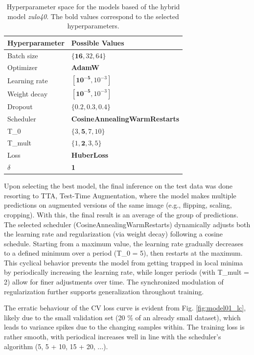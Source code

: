 \documentclass[conference]{IEEEtran}
\begin{document}
\begin{table}[H]
\centering
\caption{Hyperparameter space for the models based of the hybrid model \textit{zulo40}. The bold values correspond to the selected hyperparameters.}
\label{parametroszulp}
\begin{tabular}{ll}
\toprule
\textbf{Hyperparameter} & \textbf{Possible Values} \\
\midrule
Batch size & $\{\mathbf{16}, 32, 64\}$ \\
Optimizer & \textbf{AdamW} \\
Learning rate & $[\mathbf{10^{-5}}, 10^{-3}]$ \\
Weight decay & $[\mathbf{10^{-5}}, 10^{-3}]$ \\
Dropout & $\{0.2, 0.3, \mathbf{0.4}\}$ \\
Scheduler & \textbf{CosineAnnealingWarmRestarts} \\
T\_0 & $\{3, \mathbf{5}, 7, 10\}$ \\
T\_mult & $\{1, \mathbf{2}, 3, 5\}$ \\
Loss & \textbf{HuberLoss} \\
$\delta$ & \textbf{1} \\
\bottomrule
\end{tabular}
\end{table}

Upon selecting the best model, the final inference on the test data was done resorting to TTA, Test-Time Augmentation, where the model makes multiple predictions on augmented versions of the same image (e.g., flipping, scaling, cropping). With this, the final result is an average of the group of predictions. The selected scheduler (CosineAnnealingWarmRestarts) dynamically adjusts both the learning rate and regularization (via weight decay) following a cosine schedule. Starting from a maximum value, the learning rate gradually decreases to a defined minimum over a period (T\_0 = 5), then restarts at the maximum. This cyclical behavior prevents the model from getting trapped in local minima by periodically increasing the learning rate, while longer periods (with T\_mult = 2) allow for finer adjustments over time. The synchronized modulation of regularization further supports generalization throughout training.

The erratic behaviour of the CV loss curve is evident from Fig. \ref{fig:model01_lc}, likely due to the small validation set (20 \% of an already small dataset), which leads to variance spikes due to the changing samples within. The training loss is rather smooth, with periodical increases well in line with the scheduler's algorithm (5, 5 + 10, 15 + 20, ...).
\end{document}
